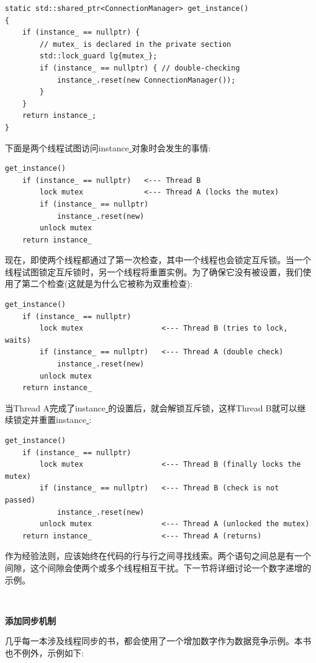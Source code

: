 \begin{lstlisting}[caption={}]
static std::shared_ptr<ConnectionManager> get_instance()
{
	if (instance_ == nullptr) {
		// mutex_ is declared in the private section
		std::lock_guard lg{mutex_};
		if (instance_ == nullptr) { // double-checking
			instance_.reset(new ConnectionManager());
		}
	}
	return instance_;
}
\end{lstlisting}

下面是两个线程试图访问instance\underline{ }对象时会发生的事情: \par

\begin{lstlisting}[caption={}]
get_instance()
	if (instance_ == nullptr) 	<--- Thread B
		lock mutex 				<--- Thread A (locks the mutex)
		if (instance_ == nullptr)
			instance_.reset(new)
		unlock mutex
	return instance_
\end{lstlisting}

现在，即使两个线程都通过了第一次检查，其中一个线程也会锁定互斥锁。当一个线程试图锁定互斥锁时，另一个线程将重置实例。为了确保它没有被设置，我们使用了第二个检查(这就是为什么它被称为双重检查): \par

\begin{lstlisting}[caption={}]
get_instance()
	if (instance_ == nullptr)
		lock mutex 					<--- Thread B (tries to lock, waits)
		if (instance_ == nullptr) 	<--- Thread A (double check)
			instance_.reset(new)
		unlock mutex
	return instance_
\end{lstlisting}

当Thread A完成了instance\underline{ }的设置后，就会解锁互斥锁，这样Thread B就可以继续锁定并重置instance\underline{ }: \par

\begin{lstlisting}[caption={}]
get_instance()
	if (instance_ == nullptr)
		lock mutex 					<--- Thread B (finally locks the mutex)
		if (instance_ == nullptr) 	<--- Thread B (check is not passed)
			instance_.reset(new)
		unlock mutex 				<--- Thread A (unlocked the mutex)
	return instance_ 				<--- Thread A (returns)
\end{lstlisting}

作为经验法则，应该始终在代码的行与行之间寻找线索。两个语句之间总是有一个间隙，这个间隙会使两个或多个线程相互干扰。下一节将详细讨论一个数字递增的示例。 \par

\noindent\textbf{}\ \par
\textbf{添加同步机制} \ \par
几乎每一本涉及线程同步的书，都会使用了一个增加数字作为数据竞争示例。本书也不例外，示例如下: \par

